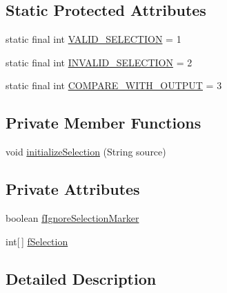 \subsection*{Static Protected Attributes}
\begin{DoxyCompactItemize}
\item 
static final int \hyperlink{classorg_1_1eclipse_1_1jdt_1_1ui_1_1tests_1_1refactoring_1_1infra_1_1AbstractSelectionTestCase_ad3d8d4dd2004b2fdab94d0dbb003304d}{VALID\_\-SELECTION} = 1
\item 
static final int \hyperlink{classorg_1_1eclipse_1_1jdt_1_1ui_1_1tests_1_1refactoring_1_1infra_1_1AbstractSelectionTestCase_a87e51300c32b4669f9f9dfa1311794ee}{INVALID\_\-SELECTION} = 2
\item 
static final int \hyperlink{classorg_1_1eclipse_1_1jdt_1_1ui_1_1tests_1_1refactoring_1_1infra_1_1AbstractSelectionTestCase_a2c7ec843ae02d8a10a949a31717b1eee}{COMPARE\_\-WITH\_\-OUTPUT} = 3
\end{DoxyCompactItemize}
\subsection*{Private Member Functions}
\begin{DoxyCompactItemize}
\item 
void \hyperlink{classorg_1_1eclipse_1_1jdt_1_1ui_1_1tests_1_1refactoring_1_1infra_1_1AbstractSelectionTestCase_a10f1e0999d71184b4ee062671713e415}{initializeSelection} (String source)
\end{DoxyCompactItemize}
\subsection*{Private Attributes}
\begin{DoxyCompactItemize}
\item 
boolean \hyperlink{classorg_1_1eclipse_1_1jdt_1_1ui_1_1tests_1_1refactoring_1_1infra_1_1AbstractSelectionTestCase_a691421d932b78353f64606f8ec2092e1}{fIgnoreSelectionMarker}
\item 
int\mbox{[}$\,$\mbox{]} \hyperlink{classorg_1_1eclipse_1_1jdt_1_1ui_1_1tests_1_1refactoring_1_1infra_1_1AbstractSelectionTestCase_ad2eec97bb16037d6c237076148847e7e}{fSelection}
\end{DoxyCompactItemize}


\subsection{Detailed Description}


